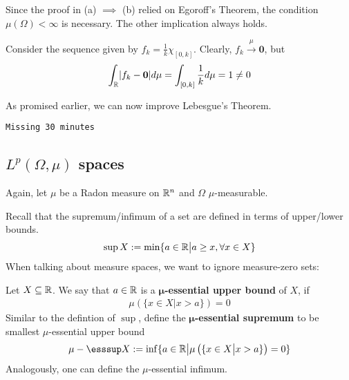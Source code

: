 \begin{rem}[] 
  Since the proof in (a) $\implies$ (b) relied on Egoroff's Theorem, the condition $\mu(\Omega) < \infty$ is necessary.
  The other implication always holds.

  Consider the sequence given by $f_k = \frac{1}{k} \chi_{[0,k]}$. 
  Clearly, $f_k \stackrel{\mu}{\to} \bm{0}$, but
  \begin{align*}
    \int_{\R} \abs{f_k - \bm{0}} d \mu = \int_{[0,k]} \frac{1}{k} d \mu = 1 \neq 0
  \end{align*}
\end{rem}


As promised earlier, we can now improve Lebesgue's Theorem.

\begin{center}
\texttt{Missing 30 minutes}
\end{center}
\begin{thm}[] \label{thm:dct-improved}
\end{thm}





\subsection{$L^{p}(\Omega,\mu)$ spaces}

Again, let $\mu$ be a Radon measure on $\mathbb{R}^{n}$ and $\Omega$ $\mu$-measurable.


Recall that the supremum/infimum of a set are defined in terms of upper/lower bounds.
\begin{align*}
  \sup X := \min\{a \in \mathbb{R} \big\vert a \geq x, \forall x \in X\}
\end{align*}
When talking about measure spaces, we want to ignore measure-zero sets:
\begin{dfn}[]
Let $X \subseteq \mathbb{R}$. We say that $a \in \mathbb{R}$ is a \textbf{$\bm{\mu}$-essential upper bound} of $X$, if
\begin{align*}
  \mu\left(
    \{x \in X \big\vert x > a\}
  \right)
  = 0
\end{align*}
Similar to the defintion of $\sup$, define the \textbf{$\bm{\mu}$-essential supremum} to be smallest $\mu$-essential upper bound
\begin{align*}
  \mu-\esssup X := \inf \{a \in \R \big\vert \mu \left(\{x \in X \big\vert x > a\}\right) = 0\}
\end{align*}
  Analogously, one can define the $\mu$-essential infimum.
\end{dfn}






